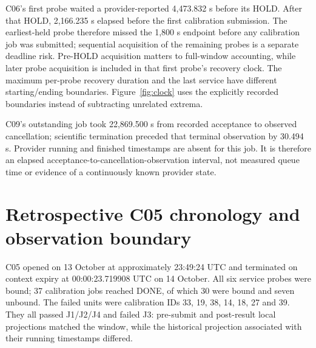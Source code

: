 \documentclass[11pt,a4paper]{article}
\begin{document}
C06's first probe waited a provider-reported 4,473.832 s before its HOLD. After that HOLD, 2,166.235 s elapsed before the first calibration submission. The earliest-held probe therefore missed the 1,800 s endpoint before any calibration job was submitted; sequential acquisition of the remaining probes is a separate deadline risk. Pre-HOLD acquisition matters to full-window accounting, while later probe acquisition is included in that first probe's recovery clock. The maximum per-probe recovery duration and the last service have different starting/ending boundaries. Figure~\ref{fig:clock} uses the explicitly recorded boundaries instead of subtracting unrelated extrema.

C09's outstanding job took 22,869.500 s from recorded acceptance to observed cancellation; scientific termination preceded that terminal observation by 30.494 s. Provider running and finished timestamps are absent for this job. It is therefore an elapsed acceptance-to-cancellation-observation interval, not measured queue time or evidence of a continuously known provider state.

\section{Retrospective C05 chronology and observation boundary}
C05 opened on 13 October at approximately 23:49:24 UTC and terminated on context expiry at 00:00:23.719908 UTC on 14 October. All six service probes were bound; 37 calibration jobs reached DONE, of which 30 were bound and seven unbound. The failed units were calibration IDs 33, 19, 38, 14, 18, 27 and 39. They all passed J1/J2/J4 and failed J3: pre-submit and post-result local projections matched the window, while the historical projection associated with their running timestamps differed.
\end{document}

